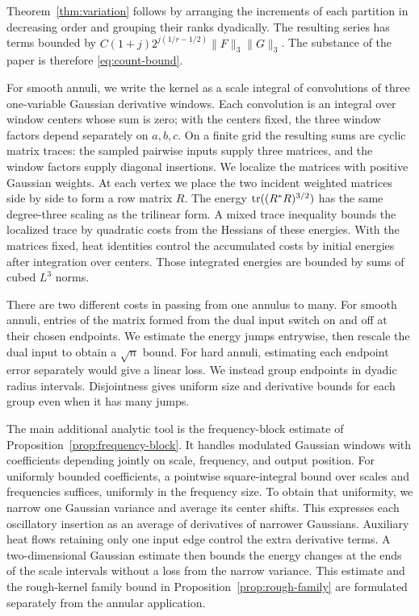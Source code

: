 Theorem~\ref{thm:variation} follows by arranging the increments of
each partition in decreasing order and grouping their ranks dyadically.
The resulting series has terms bounded by
$C(1+j)2^{j(1/r-1/2)}\|F\|_3\|G\|_3$.
The substance of the paper is therefore \eqref{eq:count-bound}.

For smooth annuli, we write the kernel as a scale integral of
convolutions of three one-variable Gaussian derivative windows.
Each convolution is an integral over window centers whose sum is zero;
with the centers fixed, the three window factors depend separately on
$a,b,c$. On a finite grid the resulting sums are cyclic matrix traces:
the sampled pairwise inputs supply three matrices, and the window
factors supply diagonal insertions. We localize the matrices with
positive Gaussian weights. At each vertex we place the two incident
weighted matrices side by side to form a row matrix $R$.
The energy $\operatorname{tr}((R^*R)^{3/2})$ has the same degree-three scaling as the
trilinear form. A mixed trace inequality bounds the localized trace by
quadratic costs from the Hessians of these energies. With the matrices
fixed, heat identities control the accumulated
costs by initial energies after integration over centers. Those
integrated energies are bounded by sums of cubed $L^3$ norms.

There are two different costs in passing from one annulus to many.
For smooth annuli, entries of the matrix formed from the dual input
switch on and off at their chosen endpoints. We estimate the energy jumps entrywise,
then rescale the dual input to obtain a $\sqrt n$ bound.
For hard annuli, estimating each endpoint error separately would
give a linear loss. We instead group endpoints in dyadic radius
intervals. Disjointness gives uniform size and derivative bounds
for each group even when it has many jumps.

The main additional analytic tool is the frequency-block estimate
of Proposition~\ref{prop:frequency-block}. It handles modulated
Gaussian windows with coefficients depending jointly on scale,
frequency, and output position. For uniformly bounded coefficients,
a pointwise square-integral bound over scales and frequencies suffices,
uniformly in the frequency size.
To obtain that uniformity, we narrow one Gaussian variance and
average its center shifts. This expresses each oscillatory insertion
as an average of derivatives of narrower Gaussians. Auxiliary heat
flows retaining only one input edge control the extra derivative
terms. A two-dimensional Gaussian estimate then bounds the energy
changes at the ends of the scale intervals without a loss from the
narrow variance.
This estimate and the rough-kernel family bound in
Proposition~\ref{prop:rough-family} are formulated separately from
the annular application.

